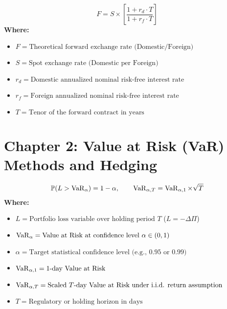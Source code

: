 \begin{formulabox}
\begin{equation}
F = S \times \left[\frac{1 + r_d \cdot T}{1 + r_f \cdot T}\right]
\end{equation}
\textbf{Where:}
\begin{itemize}[noitemsep, topsep=2pt]
    \item $F = \text{Theoretical forward exchange rate (Domestic/Foreign)}$
    \item $S = \text{Spot exchange rate (Domestic per Foreign)}$
    \item $r_d = \text{Domestic annualized nominal risk-free interest rate}$
    \item $r_f = \text{Foreign annualized nominal risk-free interest rate}$
    \item $T = \text{Tenor of the forward contract in years}$
\end{itemize}
\end{formulabox}

\section*{Chapter 2: Value at Risk (VaR) Methods and Hedging}

\begin{formulabox}
\begin{equation}
\mathbb{P}(L > \operatorname{VaR}_\alpha) = 1 - \alpha, \qquad \operatorname{VaR}_{\alpha, T} = \operatorname{VaR}_{\alpha, 1} \times \sqrt{T}
\end{equation}
\textbf{Where:}
\begin{itemize}[noitemsep, topsep=2pt]
    \item $L = \text{Portfolio loss variable over holding period } T$ ($L = -\Delta \Pi$)
    \item $\operatorname{VaR}_\alpha = \text{Value at Risk at confidence level } \alpha \in (0, 1)$
    \item $\alpha = \text{Target statistical confidence level (e.g., 0.95 or 0.99)}$
    \item $\operatorname{VaR}_{\alpha, 1} = \text{1-day Value at Risk}$
    \item $\operatorname{VaR}_{\alpha, T} = \text{Scaled } T\text{-day Value at Risk under i.i.d. return assumption}$
    \item $T = \text{Regulatory or holding horizon in days}$
\end{itemize}
\end{formulabox}

